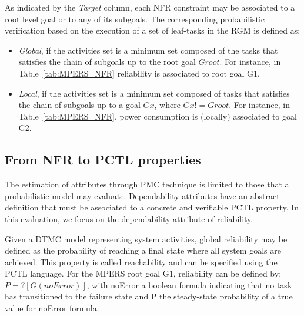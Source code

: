 
As indicated by the \textit{Target} column, each NFR constraint may be associated to a root level goal or to any of its subgoals. The corresponding probabilistic verification based on the execution of a set of leaf-tasks in the RGM is defined as:

\begin{itemize}

\item \textit{Global}, if the activities set is a minimum set composed of the tasks that satisfies the chain of subgoals up to the root goal $Groot$. For instance, in Table~\ref{tab:MPERS_NFR} reliability is associated to root goal G1.
\medskip

\item \textit{Local}, if the activities set is a minimum set composed of tasks that satisfies the chain of subgoals up to a goal $Gx$, where $Gx != Groot$. For instance, in Table~\ref{tab:MPERS_NFR}, power consumption is (locally) associated to goal G2.
\medskip

\end{itemize}


\subsection{From NFR to PCTL properties}

The estimation of attributes through PMC technique is limited to those that a probabilistic model may evaluate. Dependability attributes have an abstract definition that must be associated to a concrete and verifiable PCTL property. In this evaluation, we focus on the dependability attribute of reliability. 

Given a DTMC model representing system activities, global reliability may be defined as the probability of reaching a final state where all system goals are achieved. This property is called reachability and can be specified using the PCTL language. For the MPERS root goal G1, reliability can be defined by: $ P=? [ G (noError) ] $, with noError a boolean formula indicating that no task has transitioned to the failure state and P the steady-state probability of a true value for noError formula.


%
%
%



